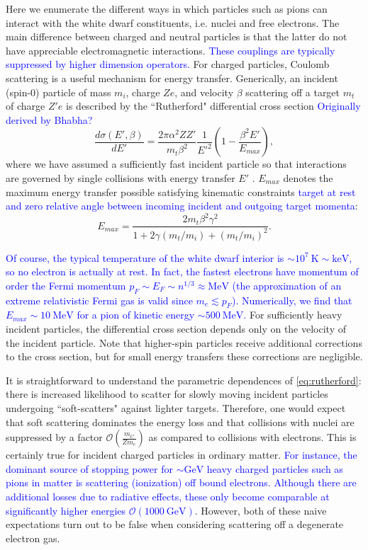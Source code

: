 \documentclass[11 pt, preprint,preprintnumbers,amsmath,amssymb, prd]{revtex4}
\newcommand{\OO}{\mathcal{O}}
\def\r{\right)}
\def\l{\left(}
\begin{document}
Here we enumerate the different ways in which particles such as pions can interact with the white dwarf constituents, i.e. nuclei and free electrons. The main difference between charged and neutral particles is that the latter do not have appreciable electromagnetic interactions. \textcolor{blue}{These couplings are typically suppressed by higher dimension operators.} For charged particles, Coulomb scattering is a useful mechanism for energy transfer. Generically, an incident (spin-0) particle of mass $m_i$, charge $Ze$, and velocity $\beta$ scattering off a target $m_t$ of charge $Z'e$ is described by the ``Rutherford" differential cross section \textcolor{blue}{Originally derived by Bhabha?}
\begin{equation}
\label{eq:rutherford}
\frac{d \sigma (E', \beta)}{dE'} = \frac{2 \pi  \alpha^2 Z Z'}{m_t \beta^2} \frac{1}{E'^2} \l1- \frac{\beta^2 E'}{E_{max}}\r, 
 \end{equation}
where we have assumed a sufficiently fast incident particle so that interactions are governed by single collisions with energy transfer $E'$ \cite{Rossi}. $E_{max}$ denotes the maximum energy transfer possible satisfying kinematic constraints \textcolor{blue}{target at rest and zero relative angle between incoming incident and outgoing target momenta}:
\begin{equation}
E_{max} = \frac{2 m_t \beta^2 \gamma^2}{1+ 2\gamma(m_t/m_i) +(m_t/m_i)^2}. 
\end{equation}

\textcolor{blue}{Of course, the typical temperature of the white dwarf interior is $\sim 10^{7} ~\text{K} \sim \text{keV}$, so no electron is actually at rest. In fact, the fastest electrons have momentum of order the Fermi momentum $p_F \sim E_F \sim n^{1/3} \approx \text{MeV}$ (the approximation of an extreme relativistic Fermi gas is valid since $m_e \lesssim p_F$). Numerically, we find that $E_{max} \sim 10 ~\text{MeV}$ for a pion of kinetic energy $\sim 500 ~\text{MeV}$.} For sufficiently heavy incident particles, the differential cross section depends only on the velocity of the incident particle. Note that higher-spin particles receive additional corrections to the cross section, but for small energy transfers these corrections are negligible.

It is straightforward to understand the parametric dependences of \eqref{eq:rutherford}: there is increased likelihood to scatter for slowly moving incident particles undergoing ``soft-scatters" against lighter targets. Therefore, one would expect that soft scattering dominates the energy loss and that collisions with nuclei are suppressed by a factor $\OO\l\frac{m_C}{Z m_e}\r$ as compared to collisions with electrons. This is certainly true for incident charged particles in ordinary matter. \textcolor{blue}{For instance, the dominant source of stopping power for $\sim \text{GeV}$ heavy charged particles such as pions in matter is scattering (ionization) off bound electrons. Although there are additional losses due to radiative effects, these only become comparable at significantly higher energies $\OO(1000~\text{GeV})$}. However, both of these naive expectations turn out to be false when considering scattering off a degenerate electron gas. 
\end{document}
